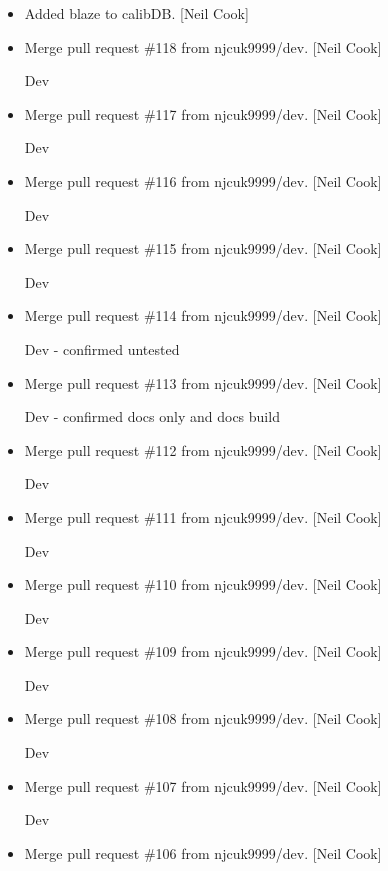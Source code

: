 \documentclass[a4paper,10pt,english]{report}
\begin{document}
\begin{itemize}
\item {} 
Added blaze to calibDB. {[}Neil Cook{]}

\item {} 
Merge pull request \#118 from njcuk9999/dev. {[}Neil Cook{]}

Dev

\item {} 
Merge pull request \#117 from njcuk9999/dev. {[}Neil Cook{]}

Dev

\item {} 
Merge pull request \#116 from njcuk9999/dev. {[}Neil Cook{]}

Dev

\item {} 
Merge pull request \#115 from njcuk9999/dev. {[}Neil Cook{]}

Dev

\item {} 
Merge pull request \#114 from njcuk9999/dev. {[}Neil Cook{]}

Dev - confirmed untested

\item {} 
Merge pull request \#113 from njcuk9999/dev. {[}Neil Cook{]}

Dev - confirmed docs only and docs build

\item {} 
Merge pull request \#112 from njcuk9999/dev. {[}Neil Cook{]}

Dev

\item {} 
Merge pull request \#111 from njcuk9999/dev. {[}Neil Cook{]}

Dev

\item {} 
Merge pull request \#110 from njcuk9999/dev. {[}Neil Cook{]}

Dev

\item {} 
Merge pull request \#109 from njcuk9999/dev. {[}Neil Cook{]}

Dev

\item {} 
Merge pull request \#108 from njcuk9999/dev. {[}Neil Cook{]}

Dev

\item {} 
Merge pull request \#107 from njcuk9999/dev. {[}Neil Cook{]}

Dev

\item {} 
Merge pull request \#106 from njcuk9999/dev. {[}Neil Cook{]}


\end{itemize}
\end{document}

